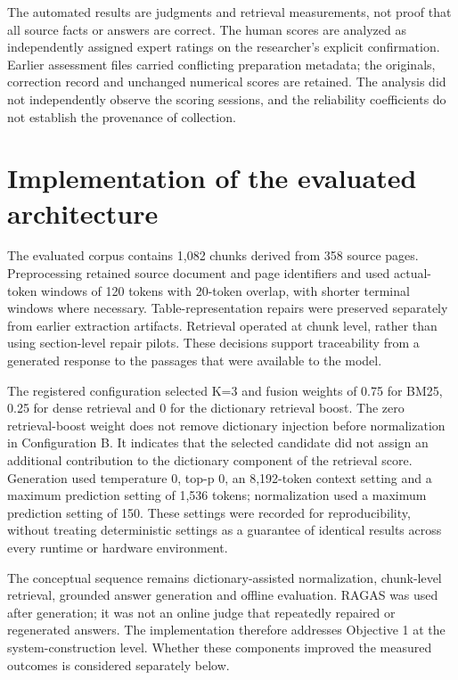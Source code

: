 The automated results are judgments and retrieval measurements, not proof that all source facts or answers are correct. The human scores are analyzed as independently assigned expert ratings on the researcher's explicit confirmation. Earlier assessment files carried conflicting preparation metadata; the originals, correction record and unchanged numerical scores are retained. The analysis did not independently observe the scoring sessions, and the reliability coefficients do not establish the provenance of collection.


\section{Implementation of the evaluated architecture}

The evaluated corpus contains 1,082 chunks derived from 358 source pages. Preprocessing retained source document and page identifiers and used actual-token windows of 120 tokens with 20-token overlap, with shorter terminal windows where necessary. Table-representation repairs were preserved separately from earlier extraction artifacts. Retrieval operated at chunk level, rather than using section-level repair pilots. These decisions support traceability from a generated response to the passages that were available to the model.


The registered configuration selected K=3 and fusion weights of 0.75 for BM25, 0.25 for dense retrieval and 0 for the dictionary retrieval boost. The zero retrieval-boost weight does not remove dictionary injection before normalization in Configuration B. It indicates that the selected candidate did not assign an additional contribution to the dictionary component of the retrieval score. Generation used temperature 0, top-p 0, an 8,192-token context setting and a maximum prediction setting of 1,536 tokens; normalization used a maximum prediction setting of 150. These settings were recorded for reproducibility, without treating deterministic settings as a guarantee of identical results across every runtime or hardware environment.


The conceptual sequence remains dictionary-assisted normalization, chunk-level retrieval, grounded answer generation and offline evaluation. RAGAS was used after generation; it was not an online judge that repeatedly repaired or regenerated answers. The implementation therefore addresses Objective 1 at the system-construction level. Whether these components improved the measured outcomes is considered separately below.


